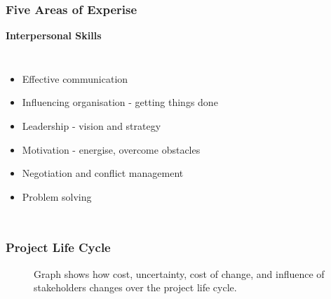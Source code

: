 \documentclass[aspectratio=169]{beamer}
\begin{document}
\begin{frame}
\frametitle{Five Areas of Experise}
\textbf{Interpersonal Skills}\\
\vspace{0.5cm}
\begin{columns}[t]
\begin{itemize}
\item Effective communication
\item Influencing organisation - getting things done
\item Leadership - vision and strategy
\item Motivation - energise, overcome obstacles
\item Negotiation and conflict management
\item Problem solving
\end{itemize}

\begin{figure}
\end{figure}
\end{columns}
\end{frame}

\begin{frame}
\frametitle{Project Life Cycle}
\begin{figure}
\caption{Graph shows how cost, uncertainty, cost of change, and influence of stakeholders changes over the project life cycle.}
\end{figure}
\end{frame}
\end{document}
